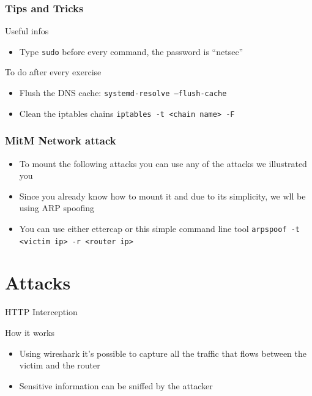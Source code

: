 \documentclass{beamer}
\begin{document}
\begin{frame}
\frametitle{Tips and Tricks}

\begin{block}{Useful infos}
  \begin{itemize}
    \item Type \texttt{sudo} before every command, the password  is ``netsec''
  \end{itemize}
\end{block}
\begin{block}{To do after every exercise}
\begin{itemize}
  \item Flush the DNS cache: \texttt{systemd-resolve --flush-cache}
  \item Clean the iptables chains \texttt{iptables -t <chain name> -F}
\end{itemize}
\end{block}

\end{frame}



\begin{frame}[fragile]
\frametitle{MitM Network attack}
\begin{block}{}
  \begin{itemize}
    \item To mount the following attacks you can use any of the attacks we illustrated you
    \item Since you already know how to mount it and due to its simplicity, we wll be using ARP spoofing
  \end{itemize}
\end{block}

\begin{block}{}
  \begin{itemize}
    \item You can use either ettercap or this simple command line tool
    \texttt{arpspoof -t <victim ip> -r <router ip>}
  \end{itemize}
\end{block}
\end{frame}


\section{Attacks}
\begin{frame}{HTTP Interception}
  \begin{block}{How it works}
    \begin{itemize}
      \item Using wireshark it's possible to capture all the traffic that flows between the victim and the router
      \item Sensitive information can be sniffed by the attacker
    \end{itemize}
  \end{block}
\end{frame}
\end{document}
